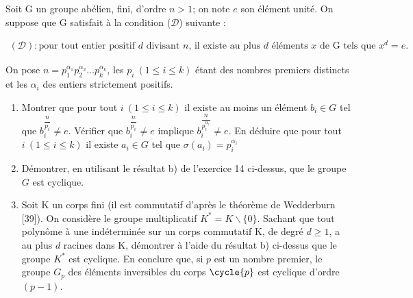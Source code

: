 
Soit G un groupe abélien, fini, d'ordre $n>1$; on note $e$ son élément unité. On suppose que G satisfait à la condition ($\mathcal{D}$) suivante :

\begin{align*}
    (\mathcal{D}) : \text{pour tout entier positif } d \text{ divisant } n\text{, il existe au plus } d \text{ éléments } x \text{ de G tels que } x^d=e. 
\end{align*}

On pose $n=p_1^{\alpha_1}p_2^{\alpha_2}\ldots p_k^{\alpha_k}$, les $p_i\ (1 \leq i \leq k)$ étant des nombres premiers distincts et les $\alpha_i$ des entiers strictement positifs.

\begin{enumerate}[label=\alph*)]
    \item Montrer que pour tout $i\ (1\leq i \leq k)$ il existe au moins un élément $b_i\in G$ tel que $b_i^{\dfrac{n}{p_i}}\neq e$. Vérifier que $b_i^{\dfrac{n}{p_i}}\neq e$ implique $b_i^{\dfrac{n}{p_i^{\alpha_i}}}\neq e$.
    En déduire que pour tout  $i\ (1\leq i \leq k)$ il existe $a_i \in G$ tel que $\sigma(a_i)= p_i^{\alpha_i}$
    \item Démontrer, en utilisant le résultat b) de l'exercice 14 ci-dessus, que le groupe $G$ est cyclique.
    \item  Soit K un corps fini (il est commutatif d'après le théorème de Wedderburn [39]). On considère le groupe multiplicatif $K^* = K \backslash \{0\}$. Sachant que tout polynôme à une indéterminée sur un corps commutatif K, de degré $d \geq 1$, a au plus $d$ racines dans K, démontrer à l'aide du résultat b) ci-dessus que le groupe $K^*$ est cyclique. En conclure que, si $p$ est un nombre premier, le groupe $G_p$ des éléments inversibles du corps $\cycle{p}$ est cyclique d'ordre $(p-1)$.
\end{enumerate}